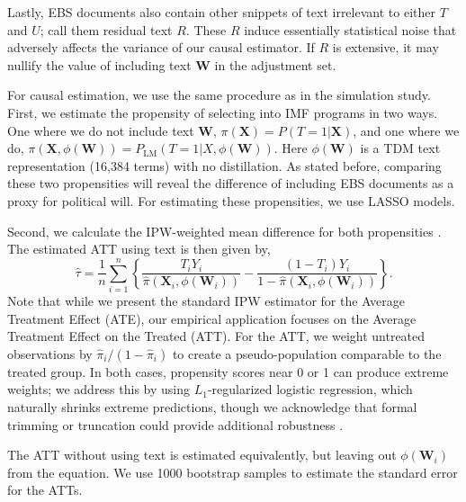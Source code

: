 \documentclass[11pt]{article}
\newcommand{\bX}{\bm{X}} %
\newcommand{\bW}{\bm{W}}  %
\begin{document}
Lastly, EBS documents also contain other snippets of text irrelevant to either $T$ and $U$; call them residual text $R$. These $R$ induce essentially statistical noise that adversely affects the variance of our causal estimator. If $R$ is extensive, it may nullify the value of including text $\bW$ in the adjustment set.

For causal estimation, we use the same procedure as in the simulation study. First, we estimate the propensity of selecting into IMF programs in two ways. One where we do not include text $\bW$, $\pi(\bX)=P(T=1|\bX)$, and one where we do, $\pi(\bX,\phi(\bW))=P_{\text{LM}}(T=1|X,\phi(\bW))$. Here $\phi(\bW)$ is a TDM text representation (16,384 terms) with no distillation. As stated before, comparing these two propensities will reveal the difference of including EBS documents as a proxy for political will. For estimating these propensities, we use LASSO models.

Second, we calculate the IPW-weighted mean difference for both propensities \citep{rosenbaum1983,funk2011doubly}. The estimated ATT using text is then given by,
\[
\widehat{\tau} =  \frac{1}{n}\sum_{i=1}^n \left\{ \frac{T_i Y_i}{\hat\pi(\bX_i,\phi(\bW_i))} -\frac{(1-T_i)Y_i}{1-\hat\pi(\bX_i,\phi(\bW_i))}\right\}.
\]
Note that while we present the standard IPW estimator for the Average Treatment Effect (ATE), our empirical application focuses on the Average Treatment Effect on the Treated (ATT). For the ATT, we weight untreated observations by $\hat{\pi}_i/(1-\hat{\pi}_i)$ to create a pseudo-population comparable to the treated group. In both cases, propensity scores near 0 or 1 can produce extreme weights; we address this by using $L_1$-regularized logistic regression, which naturally shrinks extreme predictions, though we acknowledge that formal trimming or truncation could provide additional robustness \citep{crump2009dealing}.

The ATT without using text is estimated equivalently, but leaving out $\phi(\bW_i)$ from the equation. We use 1000 bootstrap samples to estimate the standard error for the ATTs.
\end{document}

